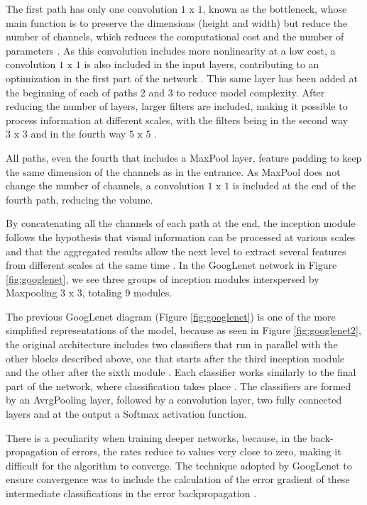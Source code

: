 The first path has only one convolution $1\text{ x }1$, known as the bottleneck, whose main function is to preserve the dimensions (height and width) but reduce the number of channels, which reduces the computational cost and the number of parameters \cite{elgendy2020}. As this convolution includes more nonlinearity at a low cost, a convolution $1\text{ x }1$ is also included in the input layers, contributing to an optimization in the first part of the network \cite{geron2019}. This same layer has been added at the beginning of each of paths 2 and 3 to reduce model complexity. After reducing the number of layers, larger filters are included, making it possible to process information at different scales, with the filters being in the second way $3\text{ x }3$ and in the fourth way  $5\text{ x }5$ \cite{zhang2020dive}.

All paths, even the fourth that includes a MaxPool layer, feature padding to keep the same dimension of the channels as in the entrance. As MaxPool does not change the number of channels, a convolution $1\text{ x }1$ is included at the end of the fourth path, reducing the volume.

By concatenating all the channels of each path at the end, the inception module follows the hypothesis that visual information can be processed at various scales and that the aggregated results allow the next level to extract several features from different scales at the same time \cite{elgendy2020}. In the GoogLenet network in Figure \ref{fig:googlenet}, we see three groups of inception modules interspersed by Maxpooling $3\text{ x }3$, totaling 9 modules.

The previous GoogLenet diagram (Figure \ref{fig:googlenet}) is one of the more simplified representations of the model, because as seen in Figure \ref{fig:googlenet2}, the original architecture includes two classifiers that run in parallel with the other blocks described above, one that starts after the third inception module and the other after the sixth module \cite{geron2019}. Each classifier works similarly to the final part of the network, where classification takes place \cite{johnson2019}. The classifiers are formed by an AvrgPooling layer, followed by a convolution layer, two fully connected layers and at the output a Softmax activation function.

There is a peculiarity when training deeper networks, because, in the back-propagation of errors, the rates reduce to values very close to zero, making it difficult for the algorithm to converge. The technique adopted by GoogLenet to ensure convergence was to include the calculation of the error gradient of these intermediate classifications in the error backpropagation \cite{geron2019}.

